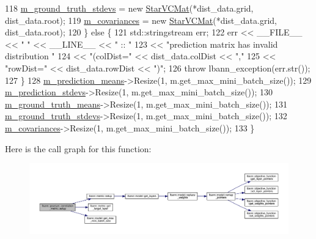 \begin{DoxyCode}
118     \hyperlink{classlbann_1_1pearson__correlation__metric_a7ed5e7a1778d17f852f4277afcaa31ed}{m\_ground\_truth\_stdevs} = \textcolor{keyword}{new} \hyperlink{base_8hpp_aa4ec814c4a8f15b4ea2b24b3af94ef23}{StarVCMat}(*dist\_data.grid, dist\_data.root);
119     \hyperlink{classlbann_1_1pearson__correlation__metric_aeabb941e22f2718a59103b7ec98a9c1e}{m\_covariances}         = \textcolor{keyword}{new} \hyperlink{base_8hpp_aa4ec814c4a8f15b4ea2b24b3af94ef23}{StarVCMat}(*dist\_data.grid, dist\_data.root);
120   \} \textcolor{keywordflow}{else} \{
121     std::stringstream err;
122     err << \_\_FILE\_\_ << \textcolor{stringliteral}{" "} << \_\_LINE\_\_ << \textcolor{stringliteral}{" :: "}
123         << \textcolor{stringliteral}{"prediction matrix has invalid distribution "}
124         << \textcolor{stringliteral}{"(colDist="} << dist\_data.colDist << \textcolor{stringliteral}{","}
125         << \textcolor{stringliteral}{"rowDist="} << dist\_data.rowDist << \textcolor{stringliteral}{")"};
126     \textcolor{keywordflow}{throw} lbann\_exception(err.str());
127   \}
128   \hyperlink{classlbann_1_1pearson__correlation__metric_ac664eebee2c3d3287848c570400bdddb}{m\_prediction\_means}->Resize(1, m.get\_max\_mini\_batch\_size());
129   \hyperlink{classlbann_1_1pearson__correlation__metric_ad288c4206078866feb39a4f982d8e975}{m\_prediction\_stdevs}->Resize(1, m.get\_max\_mini\_batch\_size());
130   \hyperlink{classlbann_1_1pearson__correlation__metric_aa67f395597bf6bbf9bd57645877f26a5}{m\_ground\_truth\_means}->Resize(1, m.get\_max\_mini\_batch\_size());
131   \hyperlink{classlbann_1_1pearson__correlation__metric_a7ed5e7a1778d17f852f4277afcaa31ed}{m\_ground\_truth\_stdevs}->Resize(1, m.get\_max\_mini\_batch\_size());
132   \hyperlink{classlbann_1_1pearson__correlation__metric_aeabb941e22f2718a59103b7ec98a9c1e}{m\_covariances}->Resize(1, m.get\_max\_mini\_batch\_size());
133 \}
\end{DoxyCode}
Here is the call graph for this function\+:\nopagebreak
\begin{figure}[H]
\begin{center}
\leavevmode
\includegraphics[width=350pt]{classlbann_1_1pearson__correlation__metric_a4394c0ebb3cacdcec934e4ae322f9bb6_cgraph}
\end{center}
\end{figure}
